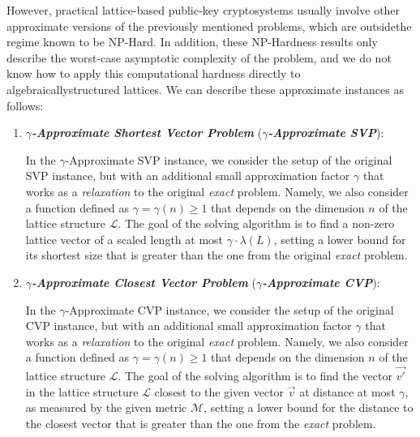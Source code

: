 \documentclass[runningheads]{llncs}
\numberwithin{equation}{section}
\begin{document}
    \newpage

    \noindent However, practical lattice-based public-key cryptosystems usually involve other approximate versions of the previously mentioned problems, which are outside\break the regime known to be NP-Hard. In addition, these NP-Hardness results only describe the worst-case asymptotic complexity of the problem, and we do not know how to apply this computational hardness directly to algebraically\break structured lattices. We can describe these approximate instances as follows:

    \begin{enumerate}
        \item \textbf{\textit{$\gamma$-Approximate Shortest Vector Problem}} (\textbf{\textit{$\gamma$-Approximate SVP}}):
        \vspace{0.6ex}
        
        In the $\gamma$-Approximate SVP instance, we consider the setup of the original SVP instance, but with an additional small approximation factor $\gamma$ that works as a \textit{relaxation} to the original \textit{exact} problem. Namely, we also consider a function defined as $\gamma = \gamma(n) \geq 1$ that depends on the dimension $n$ of the lattice structure $\mathcal{L}$. The goal of the solving algorithm is to find a non-zero lattice vector of a scaled length at most $\gamma \cdot \lambda(L)$, setting a lower bound for its shortest size that is greater than the one from the original \textit{exact} problem.
        \vspace{2ex}
        
        \item \textbf{\textit{$\gamma$-Approximate Closest Vector Problem}} (\textbf{\textit{$\gamma$-Approximate CVP}}):
        \vspace{0.6ex}

        In the $\gamma$-Approximate CVP instance, we consider the setup of the original CVP instance, but with an additional small approximation factor $\gamma$ that works as a \textit{relaxation} to the original \textit{exact} problem. Namely, we also consider a function defined as $\gamma = \gamma(n) \geq 1$ that depends on the dimension $n$ of the lattice structure $\mathcal{L}$. The goal of the solving algorithm is to find the vector $\Vec{v'}$ in the lattice structure $\mathcal{L}$ closest to the given vector $\Vec{v}$ at distance at most $\gamma$, as measured by the given metric $\mathcal{M}$, setting a lower bound for the distance to the closest vector that is greater than the one from the \textit{exact} problem.
        \vspace{2ex}
        

\end{enumerate}
\end{document}
